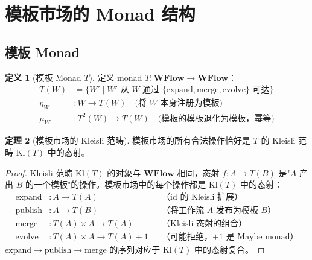 \documentclass[11pt,a4paper]{article}
\theoremstyle{definition}
\newtheorem{theorem}{定理}[section]
\theoremstyle{definition}
\newtheorem{definition}[theorem]{定义}
\theoremstyle{remark}
\newcommand{\cat}[1]{\mathbf{#1}}
\newcommand{\catWFlow}{\cat{WFlow}}
\newcommand{\functor}[3]{#1: #2 \to #3}
\newcommand{\monadT}{T}
\begin{document}
\section{模板市场的 Monad 结构}

\subsection{模板 Monad}

\begin{definition}[模板 Monad $\monadT$]
定义 monad $\functor{\monadT}{\catWFlow}{\catWFlow}$：
\[
\begin{aligned}
\monadT(W) &= \{W' \mid W' \text{ 从 } W \text{ 通过 } \{\mathrm{expand}, \mathrm{merge}, \mathrm{evolve}\} \text{ 可达}\} \\
\eta_W&: W \to \monadT(W) \quad\text{(将 $W$ 本身注册为模板)} \\
\mu_W&: \monadT^2(W) \to \monadT(W) \quad\text{(模板的模板退化为模板，幂等)}
\end{aligned}
\]
\end{definition}

\begin{theorem}[模板市场的 Kleisli 范畴]
模板市场的所有合法操作恰好是 $\monadT$ 的 Kleisli 范畴 $\mathrm{Kl}(\monadT)$ 中的态射。
\label{thm:template-kleisli}
\end{theorem}

\begin{proof}
Kleisli 范畴 $\mathrm{Kl}(\monadT)$ 的对象与 $\catWFlow$ 相同，态射 $f: A \to \monadT(B)$ 是"$A$ 产出 $B$ 的一个模板"的操作。模板市场中的每个操作都是 $\mathrm{Kl}(\monadT)$ 中的态射：
\[
\begin{aligned}
\mathrm{expand}&: A \to \monadT(A)                      &&\text{（id 的 Kleisli 扩展）} \\
\mathrm{publish}&: A \to \monadT(B)                     &&\text{（将工作流 $A$ 发布为模板 $B$）} \\
\mathrm{merge}&: \monadT(A) \times A \to \monadT(A)      &&\text{（Kleisli 态射的组合）} \\
\mathrm{evolve}&: \monadT(A) \times A \to \monadT(A) + 1 &&\text{（可能拒绝，$+1$ 是 Maybe monad）}
\end{aligned}
\]
$\mathrm{expand} \to \mathrm{publish} \to \mathrm{merge}$ 的序列对应于 $\mathrm{Kl}(\monadT)$ 中的态射复合。
\end{proof}
\end{document}
